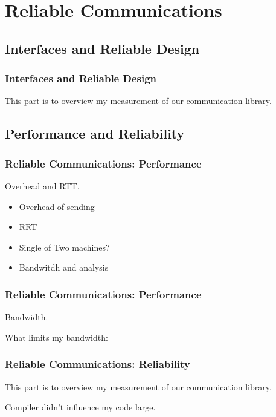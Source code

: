 \documentclass{beamer}
\begin{document}
\section{Reliable Communications}
    \subsection{Interfaces and Reliable Design}
    \begin{frame}
        \frametitle{Interfaces and Reliable Design}
        This part is to overview my measurement of our communication library.

        

    \end{frame}
    \subsection{Performance and Reliability}
    \begin{frame}
        \frametitle{Reliable Communications: Performance}
        Overhead and RTT. 

        \begin{itemize}
            \item Overhead of sending  
            \item RRT
            \item Single of Two machines?
            \item Bandwitdh and analysis 

        \end{itemize}
    \end{frame}
    \begin{frame}
        \frametitle{Reliable Communications: Performance}
        Bandwidth. 

        What limits my bandwidth: 

    \end{frame}
    
    \begin{frame}
        \frametitle{Reliable Communications: Reliability}
        This part is to overview my measurement of our communication library.

        Compiler didn't influence my code large. 

  
    \end{frame}
\end{document}

